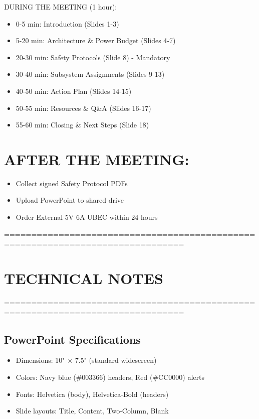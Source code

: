 \documentclass[11pt,letterpaper]{article}
\begin{document}
DURING THE MEETING (1 hour):\par

\begin{itemize}
  \item 0-5 min: Introduction (Slides 1-3)
  \item 5-20 min: Architecture \& Power Budget (Slides 4-7)
  \item 20-30 min: Safety Protocols (Slide 8) - Mandatory
  \item 30-40 min: Subsystem Assignments (Slides 9-13)
  \item 40-50 min: Action Plan (Slides 14-15)
  \item 50-55 min: Resources \& Q\&A (Slides 16-17)
  \item 55-60 min: Closing \& Next Steps (Slide 18)
\end{itemize}

\section{AFTER THE MEETING:}

\begin{itemize}
  \item Collect signed Safety Protocol PDFs
  \item Upload PowerPoint to shared drive
  \item Order External 5V 6A UBEC within 24 hours
\end{itemize}

===============================================================================\par

\section{TECHNICAL NOTES}

===============================================================================\par

\subsection{PowerPoint Specifications}

\begin{itemize}
  \item Dimensions: 10" $\times$ 7.5" (standard widescreen)
  \item Colors: Navy blue (\#003366) headers, Red (\#CC0000) alerts
  \item Fonts: Helvetica (body), Helvetica-Bold (headers)
  \item Slide layouts: Title, Content, Two-Column, Blank
\end{itemize}
\end{document}
